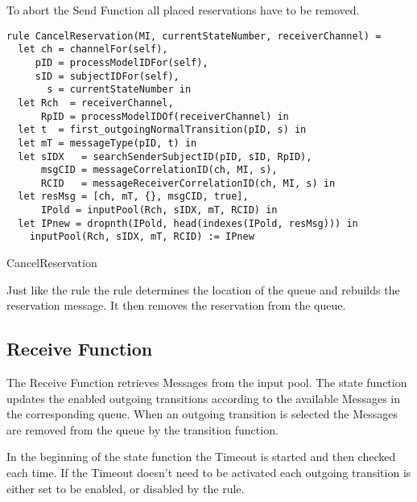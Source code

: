 To abort the Send Function all placed reservations have to be removed.


\begin{listing}[htbp]
\begin{verbatim}
rule CancelReservation(MI, currentStateNumber, receiverChannel) =
  let ch = channelFor(self),
     pID = processModelIDFor(self),
     sID = subjectIDFor(self),
       s = currentStateNumber in
  let Rch  = receiverChannel,
      RpID = processModelIDOf(receiverChannel) in
  let t  = first_outgoingNormalTransition(pID, s) in
  let mT = messageType(pID, t) in
  let sIDX   = searchSenderSubjectID(pID, sID, RpID),
      msgCID = messageCorrelationID(ch, MI, s),
      RCID   = messageReceiverCorrelationID(ch, MI, s) in
  let resMsg = [ch, mT, {}, msgCID, true],
      IPold = inputPool(Rch, sIDX, mT, RCID) in
  let IPnew = dropnth(IPold, head(indexes(IPold, resMsg))) in
    inputPool(Rch, sIDX, mT, RCID) := IPnew
\end{verbatim}
\caption{CancelReservation}
\label{lst:shortasm:CancelReservation}
\end{listing}


Just like the  rule the  rule determines the location of the queue and rebuilds the reservation message. It then removes the reservation from the queue.


\subsection{Receive Function}


The Receive Function retrieves Messages from the input pool. The state function updates the enabled outgoing transitions according to the available Messages in the corresponding queue. When an outgoing transition is selected the Messages are removed from the queue by the transition function.


In the beginning of the state function the Timeout is started and then checked each time. If the Timeout doesn't need to be activated each outgoing transition is either set to be enabled, or disabled by the  rule.


